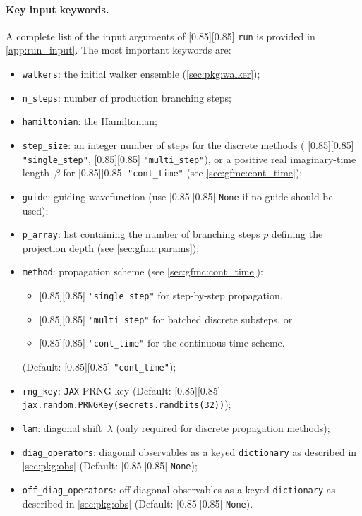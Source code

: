 \documentclass{SciPost}
\newcommand{\pyinline}[1]{\begingroup\setlength{\fboxsep}{0pt}%
  \colorbox{gray!15}{\raisebox{0pt}[0.85\ht\strutbox][0.85\dp\strutbox]{%
    \hspace{1pt}\lstinline{#1}\hspace{1pt}}}\endgroup}
\newcommand{\pyinlinebold}[1]{\begingroup\lstset{basicstyle=\ttfamily\bfseries\footnotesize}\lstinline{#1}\endgroup}
\newcommand{\JAX}{\texttt{JAX}}
\begin{document}
\paragraph{Key input keywords.}
A complete list of the input arguments of \pyinline{run} is provided in \autoref{app:run_input}.
%
The most important keywords are:
\begin{apilistbox}
\begin{itemize}
	\item \pyinlinebold{walkers}: the initial walker ensemble (\autoref{sec:pkg:walker});
	\item \pyinlinebold{n_steps}: number of production branching steps;
	\item \pyinlinebold{hamiltonian}: the Hamiltonian;
	\item \pyinlinebold{step_size}: an integer number of steps for the discrete methods (\pyinline{"single_step"}, \pyinline{"multi_step"}), or a positive real imaginary-time length~$\beta$ for \pyinline{"cont_time"} (see \autoref{sec:gfmc:cont_time});
	\item \pyinlinebold{guide}: guiding wavefunction (use \pyinline{None} if no guide should be used);
	\item \pyinlinebold{p_array}: list containing the number of branching steps $p$ defining the projection depth (see \autoref{sec:gfmc:params});
	\item \pyinlinebold{method}: propagation scheme (see \autoref{sec:gfmc:cont_time}):
			\begin{itemize}
	      	\item \pyinline{"single_step"} for step-by-step propagation,
	      	\item \pyinline{"multi_step"} for batched discrete substeps, or
	      	\item \pyinline{"cont_time"} for the continuous-time scheme.
			\end{itemize}
	       (Default: \pyinline{"cont_time"});
	   \item \pyinlinebold{rng_key}: \JAX{} PRNG key (Default: \pyinline{jax.random.PRNGKey(secrets.randbits(32))});
	   \item \pyinlinebold{lam}: diagonal shift~$\lambda$ (only required for discrete propagation methods);
	   \item \pyinlinebold{diag_operators}: diagonal observables as a keyed \texttt{dictionary} as described in \autoref{sec:pkg:obs} (Default: \pyinline{None});
	   \item \pyinlinebold{off_diag_operators}: off-diagonal observables as a keyed \texttt{dictionary} as described in \autoref{sec:pkg:obs} (Default: \pyinline{None}).
\end{itemize}
\end{apilistbox}
\end{document}
